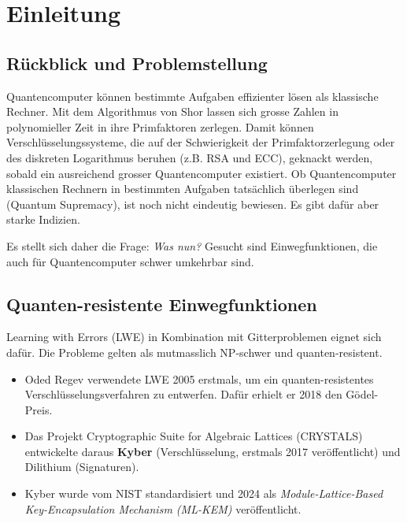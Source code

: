 \chapter{Einleitung}\label{ch:introduction}

\section{Rückblick und Problemstellung}
Quantencomputer können bestimmte Aufgaben effizienter lösen als klassische Rechner. Mit dem Algorithmus von Shor lassen sich grosse Zahlen in polynomieller Zeit in ihre Primfaktoren zerlegen. Damit können Verschlüsselungssysteme, die auf der Schwierigkeit der Primfaktorzerlegung oder des diskreten Logarithmus beruhen (z.B. RSA und ECC), geknackt werden, sobald ein ausreichend grosser Quantencomputer existiert. Ob Quantencomputer klassischen Rechnern in bestimmten Aufgaben tatsächlich überlegen sind (Quantum Supremacy), ist noch nicht eindeutig bewiesen. Es gibt dafür aber starke Indizien.

Es stellt sich daher die Frage: \emph{Was nun?} Gesucht sind Einwegfunktionen, die auch für Quantencomputer schwer umkehrbar sind.

\section{Quanten-resistente Einwegfunktionen}
Learning with Errors (LWE) in Kombination mit Gitterproblemen eignet sich dafür. Die Probleme gelten als mutmasslich NP-schwer und quanten-resistent.
\begin{itemize}
    \item Oded Regev verwendete LWE 2005 erstmals, um ein quanten-resistentes Verschlüsselungsverfahren zu entwerfen. Dafür erhielt er 2018 den Gödel-Preis.
    \item Das Projekt Cryptographic Suite for Algebraic Lattices (CRYSTALS) entwickelte daraus \textbf{Kyber} (Verschlüsselung, erstmals 2017 veröffentlicht) und Dilithium (Signaturen).
    \item Kyber wurde vom NIST standardisiert und 2024 als \textit{Module-Lattice-Based Key-Encapsulation Mechanism (ML-KEM)} veröffentlicht.
\end{itemize}
